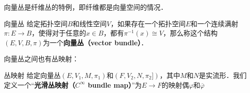 
向量丛是纤维丛的特例，即纤维都是向量空间的情况．

\begin{definition}{向量丛}
给定拓扑空间$B$和线性空间$V$，如果存在一个拓扑空间$E$和一个连续满射$\pi:E\rightarrow B$，使得对于任意的$x\in B$，都有$\pi^{-1}(x)\cong V$，那么称这个结构$(E, V, B, \pi)$为一个\textbf{向量丛（vector bundle）}．
\end{definition}

向量丛之间也有丛映射：

\begin{definition}{丛映射}
给定向量丛$(E, V_1, M, \pi_1)$和$(F, V_2, N, \pi_2])$，其中$M$和$N$是实流形．我们定义一个“\textbf{光滑丛映射（$C^\infty$ bundle map）}”为$E\rightarrow F$的映射偶$\varphi$和$\overline{\varphi}$
\end{definition}





